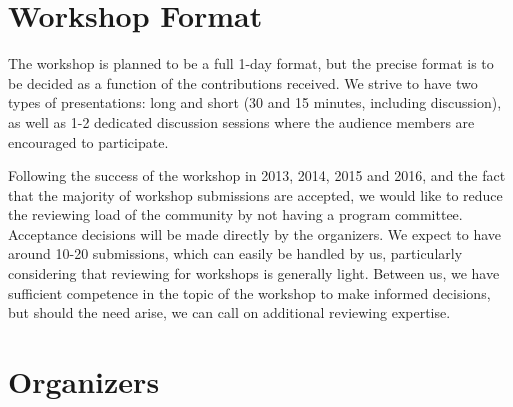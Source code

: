 \documentclass[10pt]{article}
\begin{document}
\section*{Workshop Format}

The workshop is planned to be a full 1-day format, but the precise
format is to be decided as a function of the contributions received.
We strive to have two types of presentations: long and short (30 and
15 minutes, including discussion), as well as 1-2 dedicated discussion
sessions where the audience members are encouraged to participate.

Following the success of the workshop in 2013, 2014, 2015 and 2016, and the fact that
the majority of workshop submissions are accepted, we would like to reduce
the reviewing load of the community by not having a program
committee. Acceptance decisions will be made directly by the
organizers. We expect to have around 10-20 submissions, which can
easily be handled by us, particularly considering that reviewing for
workshops is generally light. Between us, we have sufficient
competence in the topic of the workshop to make informed decisions,
but should the need arise, we can call on additional reviewing
expertise.

\section*{Organizers}
\end{document}
